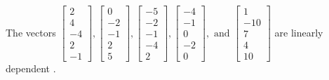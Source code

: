 \begin{exercise}
\begin{exerciseStatement}
  \end{exerciseStatement}
  \begin{exerciseAnswer}
   The vectors \(\left[\begin{array}{r}
2 \\
4 \\
-4 \\
2 \\
-1
\end{array}\right] , \left[\begin{array}{r}
0 \\
-2 \\
-1 \\
2 \\
5
\end{array}\right] , \left[\begin{array}{r}
-5 \\
-2 \\
-1 \\
-4 \\
2
\end{array}\right] , \left[\begin{array}{r}
-4 \\
-1 \\
0 \\
-2 \\
0
\end{array}\right] , \text{ and } \left[\begin{array}{r}
1 \\
-10 \\
7 \\
4 \\
10
\end{array}\right]\) are 
  	 linearly dependent  .
  


  \end{exerciseAnswer}
\end{exercise}
